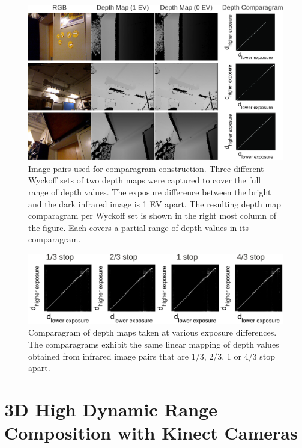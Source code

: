\begin{figure}
\centering 
\includegraphics[width=6.5in]{ch4/diagrams/jason_depth.pdf} 
\caption{Image pairs used for comparagram construction. Three different Wyckoff sets of two depth maps were captured to cover the full range of depth values. The exposure difference between the bright and the dark infrared image is 1 EV apart. The resulting depth map comparagram per Wyckoff set is shown in the right most column of the figure. Each covers a partial range of depth values in its comparagram.} 
\label{fig_depth_parts} 
\end{figure}
\begin{figure} 
\centering \includegraphics[width=6.5in]{ch4/diagrams/jason_collection.pdf} 
\caption{Comparagram of depth maps taken at various exposure differences. The comparagrams exhibit the same linear mapping of depth values obtained from infrared image pairs that are 1/3, 2/3, 1 or 4/3 stop apart.}
\label{fig_various} 
\end{figure}


\section{3D High Dynamic Range Composition with Kinect Cameras} 

